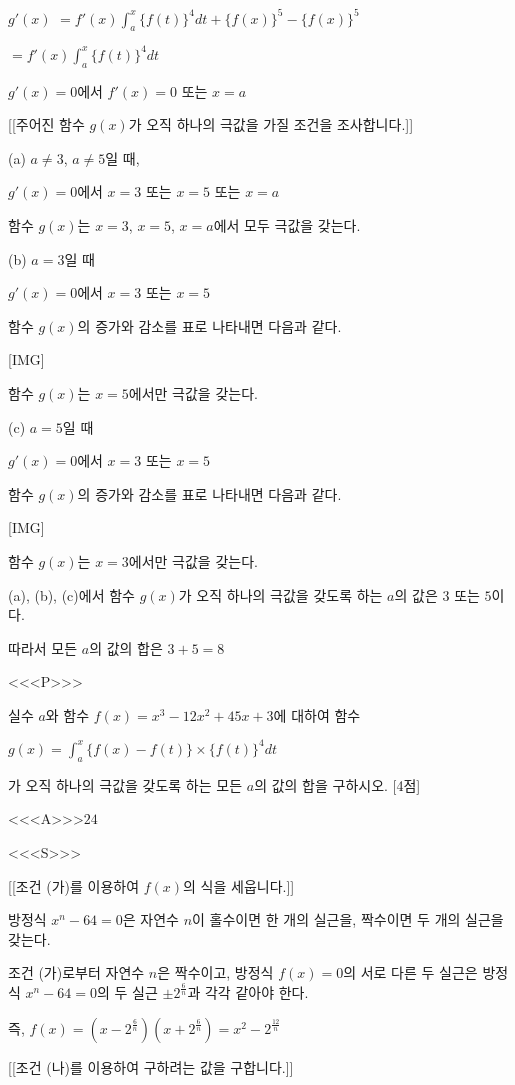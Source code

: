 \documentclass{oblivoir}
\begin{document}
$g'(x)$ $=f'(x)\displaystyle\int_{a}^{x}\{f(t)\}^{4}dt +\{f(x)\}^{5}-\{f(x)\}^{5}$

$=f'(x)\displaystyle\int_{a}^{x}\{f(t)\}^{4}dt$

$g'(x)=0$에서 $f'(x)=0$ 또는 $x=a$

[[주어진 함수 $g(x)$가 오직 하나의 극값을 가질 조건을 조사합니다.]]

(a) $a\ne 3$, $a\ne 5$일 때, 

$g'(x)=0$에서 $x=3$ 또는 $x=5$ 또는 $x=a$

함수 $g(x)$는 $x=3$, $x=5$, $x=a$에서 모두 극값을 갖는다.

(b) $a=3$일 때

$g'(x)=0$에서 $x=3$ 또는 $x=5$

함수 $g(x)$의 증가와 감소를 표로 나타내면 다음과 같다.

[IMG]

함수 $g(x)$는 $x=5$에서만 극값을 갖는다.

(c) $a=5$일 때

$g'(x)=0$에서 $x=3$ 또는 $x=5$

함수 $g(x)$의 증가와 감소를 표로 나타내면 다음과 같다.

[IMG]

함수 $g(x)$는 $x=3$에서만 극값을 갖는다.

(a), (b), (c)에서 함수 $g(x)$가 오직 하나의 극값을 갖도록 하는 $a$의 값은 $3$ 또는 $5$이다.

따라서 모든 $a$의 값의 합은 $3+5=8$

<<<P>>>

실수 $a$와 함수 $f(x)=x^{3}-12x^{2}+45x+3$에 대하여 함수

$g(x)=\displaystyle\int_{a}^{x}\{f(x)-f(t)\}\times\{f(t)\}^{4}dt$

가 오직 하나의 극값을 갖도록 하는 모든 $a$의 값의 합을 구하시오. [4점]

<<<A>>>$24$

<<<S>>>

[[조건 (가)를 이용하여 $f(x)$의 식을 세웁니다.]]

방정식 $x^{n}-64=0$은 자연수 $n$이 홀수이면 한 개의 실근을, 짝수이면 두 개의 실근을 갖는다.

조건 (가)로부터 자연수 $n$은 짝수이고, 방정식 $f(x)=0$의 서로 다른 두 실근은 방정식 $x^{n}-64=0$의 두 실근 $\pm 2^{\frac{6}{n}}$과 각각 같아야 한다.

즉, $f(x)=\left(x-2^{\frac{6}{n}}\right)\left(x+2^{\frac{6}{n}}\right)=x^{2}-2^{\frac{12}{n}}$

[[조건 (나)를 이용하여 구하려는 값을 구합니다.]]
\end{document}
